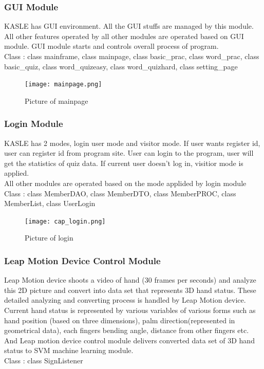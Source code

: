 \documentclass[10pt,journal,compsoc]{IEEEtran}
\begin{document}
\subsubsection{GUI Module\\}

KASLE has GUI environment. All the GUI stuffs are managed by this module. All other features operated by all other modules are operated based on GUI module. GUI module starts and controls overall process of program.
\\Class : class mainframe, class mainpage, class basic\_prac, class word\_prac, class basic\_quiz, class word\_quizeasy, class word\_quizhard, class setting\_page
\begin{figure}[H]
\centering
\texttt{[image: mainpage.png]}
{\caption*{Picture of mainpage}}
\end{figure}
\subsubsection{Login Module\\}

KASLE has 2 modes, login user mode and visitor mode. If user wants register id, user can register id from program site. User can login to the program, user will get the statistics of quiz data. If current user doesn't log in, visitior mode is applied.
\\All other modules are operated based on the mode applided by login module
\\Class : class MemberDAO, class MemberDTO, class MemberPROC, class MemberList, class UserLogin

\begin{figure}[H]
\centering
\texttt{[image: cap\_login.png]}
{\caption*{Picture of login}}
\end{figure}
\subsubsection{Leap Motion Device Control Module\\}

Leap Motion device shoots a video of hand (30 frames per seconds) and analyze this 2D picture and convert into data set that represents 3D hand status. These detailed analyzing and converting process is handled by Leap Motion device.
Current hand status is represented by various variables of various forms such as hand position (based on three dimensions), palm direction(represented in geometrical data), each fingers bending angle, distance from other fingers etc.
\\And Leap motion device control module delivers converted data set of 3D hand status to SVM machine learning module.
\\Class : class SignListener
\end{document}
